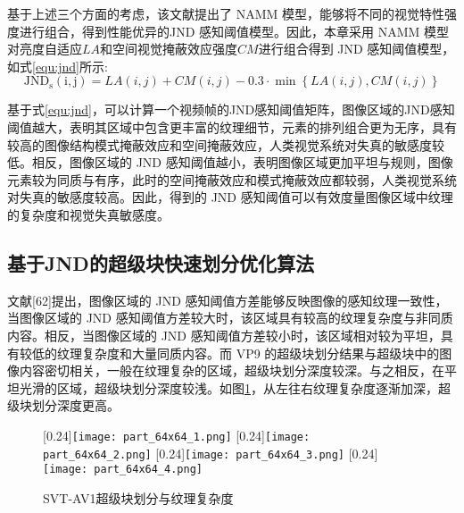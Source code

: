   基于上述三个方面的考虑，该文献提出了 NAMM 模型，能够将不同的视觉特性强度进行组合，得到性能优异的JND 感知阈值模型。因此，本章采用 NAMM 模型对亮度自适应$LA$和空间视觉掩蔽效应强度$CM$进行组合得到 JND 感知阈值模型，如式\ref{equ:jnd}所示:
  \begin{equation} \label{equ:jnd}
    \mathrm{JND_s(i, j)} = LA(i, j) + CM(i, j) - 0.3 \cdot \min \left\{LA(i, j) , CM(i, j)\right\}
  \end{equation}

  基于式\ref{equ:jnd}，可以计算一个视频帧的JND感知阈值矩阵，图像区域的JND感知阈值越大，表明其区域中包含更丰富的纹理细节，元素的排列组合更为无序，具有较高的图像结构模式掩蔽效应和空间掩蔽效应，人类视觉系统对失真的敏感度较低。相反，图像区域的 JND 感知阈值越小，表明图像区域更加平坦与规则，图像元素较为同质与有序，此时的空间掩蔽效应和模式掩蔽效应都较弱，人类视觉系统对失真的敏感度较高。因此，得到的 JND 感知阈值可以有效度量图像区域中纹理的复杂度和视觉失真敏感度。





  \subsection{基于JND的超级块快速划分优化算法}
  文献[62]提出，图像区域的 JND 感知阈值方差能够反映图像的感知纹理一致性，当图像区域的 JND 感知阈值方差较大时，该区域具有较高的纹理复杂度与非同质内容。相反，当图像区域的 JND 感知阈值方差较小时，该区域相对较为平坦，具有较低的纹理复杂度和大量同质内容。而 VP9 的超级块划分结果与超级块中的图像内容密切相关，一般在纹理复杂的区域，超级块划分深度较深。与之相反，在平坦光滑的区域，超级块划分深度较浅。如图\ref{fig:jnd-sb}，从左往右纹理复杂度逐渐加深，超级块划分深度更高。

  \begin{figure}[!hbtp]
    \centering
                    [0.24\textwidth]{\texttt{[image: part\_64x64\_1.png]}\label{fig:jnd-sb-1}}
                    [0.24\textwidth]{\texttt{[image: part\_64x64\_2.png]}}
                    [0.24\textwidth]{\texttt{[image: part\_64x64\_3.png]}}
                    [0.24\textwidth]{\texttt{[image: part\_64x64\_4.png]}\label{fig:jnd-sb-4}}
    \caption{SVT-AV1超级块划分与纹理复杂度}
    \label{fig:jnd-sb}
  \end{figure}

